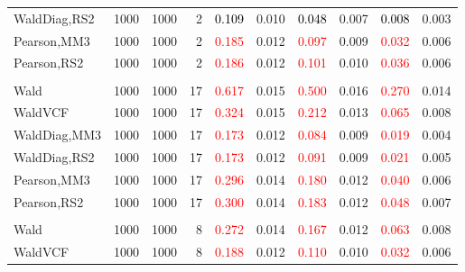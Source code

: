 \documentclass[
]{article}
\begin{document}
\begin{table}[H]
{\begin{tabular}[t]{lrrrrrrlrr}
\hspace{1em}WaldDiag,RS2 & 1000 & 1000 & 2 & \textcolor{black}{0.109} & 0.010 & \textcolor{black}{0.048} & 0.007 & \textcolor{black}{0.008} & 0.003\\
\hspace{1em}Pearson,MM3 & 1000 & 1000 & 2 & \textcolor{red}{0.185} & 0.012 & \textcolor{red}{0.097} & 0.009 & \textcolor{red}{0.032} & 0.006\\
\hspace{1em}Pearson,RS2 & 1000 & 1000 & 2 & \textcolor{red}{0.186} & 0.012 & \textcolor{red}{0.101} & 0.010 & \textcolor{red}{0.036} & 0.006\\
\addlinespace[0.3em]
\multicolumn{10}{l}{\textbf{1F 15V}}\\
\hspace{1em}Wald & 1000 & 1000 & 17 & \textcolor{red}{0.617} & 0.015 & \textcolor{red}{0.500} & 0.016 & \textcolor{red}{0.270} & 0.014\\
\hspace{1em}WaldVCF & 1000 & 1000 & 17 & \textcolor{red}{0.324} & 0.015 & \textcolor{red}{0.212} & 0.013 & \textcolor{red}{0.065} & 0.008\\
\hspace{1em}WaldDiag,MM3 & 1000 & 1000 & 17 & \textcolor{red}{0.173} & 0.012 & \textcolor{red}{0.084} & 0.009 & \textcolor{red}{0.019} & 0.004\\
\hspace{1em}WaldDiag,RS2 & 1000 & 1000 & 17 & \textcolor{red}{0.173} & 0.012 & \textcolor{red}{0.091} & 0.009 & \textcolor{red}{0.021} & 0.005\\
\hspace{1em}Pearson,MM3 & 1000 & 1000 & 17 & \textcolor{red}{0.296} & 0.014 & \textcolor{red}{0.180} & 0.012 & \textcolor{red}{0.040} & 0.006\\
\hspace{1em}Pearson,RS2 & 1000 & 1000 & 17 & \textcolor{red}{0.300} & 0.014 & \textcolor{red}{0.183} & 0.012 & \textcolor{red}{0.048} & 0.007\\
\addlinespace[0.3em]
\multicolumn{10}{l}{\textbf{2F 10V}}\\
\hspace{1em}Wald & 1000 & 1000 & 8 & \textcolor{red}{0.272} & 0.014 & \textcolor{red}{0.167} & 0.012 & \textcolor{red}{0.063} & 0.008\\
\hspace{1em}WaldVCF & 1000 & 1000 & 8 & \textcolor{red}{0.188} & 0.012 & \textcolor{red}{0.110} & 0.010 & \textcolor{red}{0.032} & 0.006\\

\end{tabular}}
\end{table}
\end{document}
